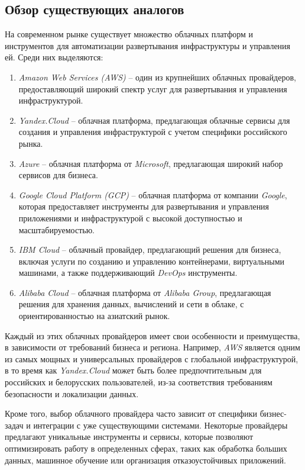 \subsection{Обзор существующих аналогов}
\label{sec:existing_analogs}
На современном рынке существует множество облачных платформ и инструментов для автоматизации развертывания инфраструктуры и управления ей. Среди них выделяются:
\begin{enumerate}
    \item \textit{Amazon Web Services (AWS)} -- один из крупнейших облачных провайдеров, предоставляющий широкий спектр услуг для развертывания и управления инфраструктурой.
    \item \textit{Yandex.Cloud} -- облачная платформа, предлагающая облачные сервисы для создания и управления инфраструктурой с учетом специфики российского рынка\cite{yandexcloud}.
    \item \textit{Azure} -- облачная платформа от \textit{Microsoft}, предлагающая широкий набор сервисов для бизнеса.
    \item \textit{Google Cloud Platform (GCP)} -- облачная платформа от компании \textit{Google}, которая предоставляет инструменты для развертывания и управления приложениями и инфраструктурой с высокой доступностью и масштабируемостью.
    \item \textit{IBM Cloud} -- облачный провайдер, предлагающий решения для бизнеса, включая услуги по созданию и управлению контейнерами, виртуальными машинами, а также поддерживающий \textit{DevOps} инструменты.
    \item \textit{Alibaba Cloud} -- облачная платформа от \textit{Alibaba Group}, предлагающая решения для хранения данных, вычислений и сети в облаке, с ориентированностью на азиатский рынок.
\end{enumerate}

Каждый из этих облачных провайдеров имеет свои особенности и преимущества, в зависимости от требований бизнеса и региона. Например, \textit{AWS} является одним из самых мощных и универсальных провайдеров с глобальной инфраструктурой, в то время как \textit{Yandex.Cloud} может быть более предпочтительным для российских и белорусских пользователей, из-за соответствия требованиям безопасности и локализации данных.

Кроме того, выбор облачного провайдера часто зависит от специфики бизнес-задач и интеграции с уже существующими системами. Некоторые провайдеры предлагают уникальные инструменты и сервисы, которые позволяют оптимизировать работу в определенных сферах, таких как обработка больших данных, машинное обучение или организация отказоустойчивых приложений.

